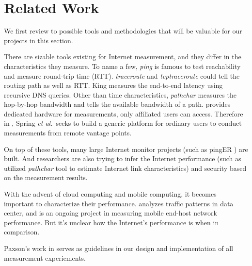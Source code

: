 \section{Related Work}
\label{sec:related-work}


We first review to possible tools and methodologies that will be valuable for our projects in this section.

There are sizable tools existing for Internet measurement, and they differ in the characteristics they measure. To name a few, {\em ping} is famous to test reachability and measure round-trip time (RTT). {\em traceroute} \cite{jacobson1989traceroute} and {\em tcptraceroute} \cite{toren2001tcptraceroute} could tell the routing path as well as RTT. King \cite{gummadi2002king} measures the end-to-end latency using recursive DNS queries. Other than time characteristics, {\em pathchar} \cite{jacobson1997pathchar} measures the hop-by-hop bandwidth and \cite{jain2002pathload} tells the available bandwidth of a path. \cite{paxson2002experiences} provides dedicated hardware for measurements, only affiliated  users can access. Therefore in \cite{spring2003scriptroute}, Spring {\em et al.}\, seeks to build a generic platform for ordinary users to conduct measurements from remote vantage points.

On top of these tools, many large Internet monitor projects (such as pingER \cite{matthews2000pinger}) are built. And researchers are also trying to infer the Internet performance (such as \cite{downey1999using} utilized {\em pathchar} tool to estimate Internet link characteristics) and security \cite{paxson1999bro} based on the measurement results. 

With the advent of cloud computing and mobile computing, it becomes important to characterize their performance. \cite{kandula2009nature, benson2010network} analyzes traffic patterns in data center, and \cite{huang2011mobiperf} is an ongoing project in measuring mobile end-host network performance. But it's unclear how the Internet's performance is when in comparison.

Paxson's work in \cite{paxson1997measurements, paxson1997end, paxson2004strategies} serves as guidelines in our design and implementation of all measurement experiements.

